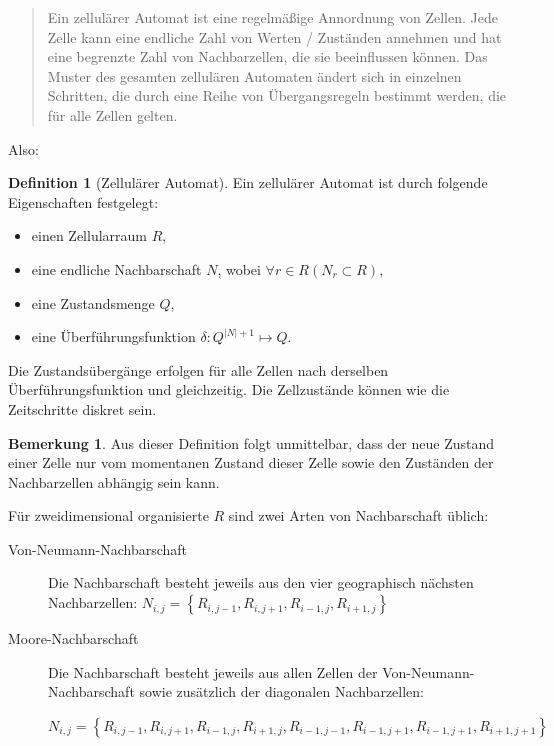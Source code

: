 \documentclass[11pt]{report} %
\theoremstyle{definition}
\newtheorem{definition}{Definition}
\newtheorem*{bemerkung}{Bemerkung}
\begin{document}
\begin{quote}Ein zellulärer Automat ist eine regelmäßige Annordnung von Zellen. Jede Zelle kann eine endliche Zahl
von Werten / Zuständen annehmen und hat eine begrenzte Zahl von Nachbarzellen, die sie beeinflussen
können. Das Muster des gesamten zellulären Automaten ändert sich in einzelnen Schritten, die durch eine
Reihe von Übergangsregeln bestimmt werden, die für alle Zellen gelten.\cite{beckmann}\end{quote}

Also:

\begin{definition}[Zellulärer Automat] Ein zellulärer Automat ist durch folgende Eigenschaften festgelegt:
\begin{itemize}
\item einen Zellularraum $R$,
\item eine endliche Nachbarschaft $N$, wobei $\forall r \in R \left(N_r \subset R\right)$,
\item eine Zustandsmenge $Q$,
\item eine Überführungsfunktion $\delta: Q^{|N| + 1}\mapsto Q$.
\end{itemize}
Die Zustandsübergänge erfolgen für alle Zellen nach derselben Überführungsfunktion und gleichzeitig. Die Zellzustände können wie die Zeitschritte diskret sein. \cite{wiki:zellautomat}

\end{definition}

\begin{bemerkung}
Aus dieser Definition folgt unmittelbar, dass der neue Zustand einer Zelle nur vom momentanen Zustand dieser Zelle sowie den Zuständen der Nachbarzellen abhängig sein kann.
\end{bemerkung}

Für zweidimensional organisierte $R$ sind zwei Arten von Nachbarschaft üblich:
\begin{description}
\item[Von-Neumann-Nachbarschaft] Die Nachbarschaft besteht jeweils aus den vier geographisch nächsten Nachbarzellen: $N_{i,j} = \left\{ R_{i,j-1}, R_{i,j+1}, R_{i-1,j}, R_{i+1,j}\right\}$
\item[Moore-Nachbarschaft] Die Nachbarschaft besteht jeweils aus allen Zellen der Von-Neumann-Nachbarschaft sowie zusätzlich der diagonalen Nachbarzellen:

$N_{i,j} = \left\{ R_{i,j-1}, R_{i,j+1}, R_{i-1,j}, R_{i+1,j},R_{i-1,j-1}, R_{i-1,j+1}, R_{i-1,j+1}, R_{i+1,j+1} \right\}$ \cite{schurr}
\end{description}
\end{document}
